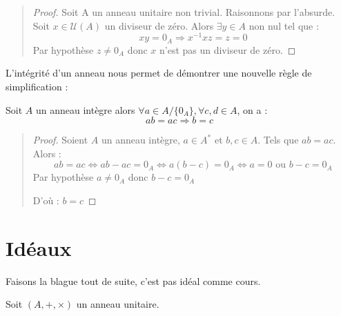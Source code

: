 \begin{quote}
    \begin{footnotesize}
        \begin{proof}
            Soit A un anneau unitaire non trivial. Raisonnons par l'absurde. 
            Soit $x \in \mathcal{U}(A)$ un diviseur de zéro. Alors $ \exists y \in A$ non nul tel que :
                \[ xy = 0_A \Longrightarrow x^{-1}xz = z = 0 \] 
            Par hypothèse $z \not = 0_A$ donc $x$ n'est pas un diviseur de zéro. 
        \end{proof}
    \end{footnotesize}
\end{quote}

L'intégrité d'un anneau nous permet de démontrer une nouvelle règle de simplification :

\begin{prop}
    Soit $A$ un anneau intègre alors $ \forall a \in A/\{0_A\}, \forall c,d \in A$, on a :
        \[ ab = ac \Longrightarrow b = c \]  
\end{prop}

\begin{quote}
    \begin{footnotesize}
        \begin{proof}
            Soient $A$ un anneau intègre, $a \in A^*$ et $b,c \in A$. Tels que $ab = ac$. Alors :
                \[ ab = ac \iff ab -ac = 0_A \iff a (b-c) = 0_A \iff a = 0 \text{ ou } b-c = 0_A \] 
                {Par hypothèse } $ a \not = 0_A$ { donc } $b-c = 0_A$ 

                {D'où : }$ b = c $
        \end{proof}
    \end{footnotesize}
\end{quote}


\section{Idéaux}

Faisons la blague tout de suite, c'est pas idéal comme cours. 

\vspace{0.3cm}

Soit $(A,+,\times)$ un anneau unitaire. 

